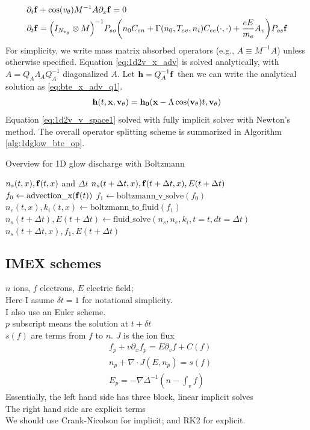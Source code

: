 \documentclass{article}[draft]
\begin{document}
\begin{align}
	&\partial_t \vect{f} + \cos\of{\vtheta} M^{-1} A \partial_x \vect{f} = 0 \label{eq:1d2v_x_adv} \\
	&\partial_t \vect{f} =\of{I_{N_{\vtheta}} \otimes M  }^{-1} P_{so}\of{n_0 C_{en} + \Gamma(n_0, T_{ev}, n_i) C_{ee} (\cdot, \cdot) + \frac{e E}{m_e} A_v} P_{os} \vect{f} \label{eq:1d2v_v_space1}
\end{align} For simplicity, we write mass matrix absorbed operators (e.g., $A \equiv M^{-1} A$) unless otherwise specified. Equation \eqref{eq:1d2v_x_adv} is solved analytically, with $A=Q_A \Lambda_A Q_A^{-1}$ diagonalized $A$. Let $\mathbf{h} = Q_{A}^{-1}\mathbf{f}$ then we can write the analytical solution as \eqref{eq:bte_x_adv_q1}.
\begin{align}
	\mathbf{h}(t,\mathbf{x},\mathbf{{v_{\theta}}}) = \mathbf{h_0}(\mathbf{x} - \Lambda\cos(\mathbf{{v_{\theta}}}) t, \mathbf{{v_{\theta}}}) \label{eq:bte_x_adv_q1}
\end{align} Equation \eqref{eq:1d2v_v_space1} solved with fully implicit solver with Newton's method. 
The overall operator splitting scheme is summarized in Algorithm \ref{alg:1dglow_bte_op}.

\begin{algorithm}[!tbhp]
	\caption{Overview for 1D glow discharge with Boltzmann \label{alg:1dglow_bte_op}}
	\begin{algorithmic}[0]
		\Require $n_s(t,x), \mathbf{f}(t,x)$ and $\Delta t$
		\Ensure $n_s(t + \Delta t, x), \mathbf{f}(t + \Delta t, x), E(t+\Delta t)$ 
		\State $f_0 \leftarrow \text{advection\_x} (\mathbf{f}(t))$
		\State $f_1 \leftarrow \text{boltzmann\_v\_solve} (f_0) $
		\State $n_e(t, x), k_i(t, x) \leftarrow \text{boltzmann\_to\_fluid}(f_1)$ 
		\State $n_s(t + \Delta t), E(t+\Delta t) \leftarrow \text{fluid\_solve}(n_s, n_e, k_i, t = t, dt=\Delta t)$
		\State \Return $n_s(t + \Delta t, x), f_1, E(t+\Delta t)$ 
	\end{algorithmic}
\end{algorithm}

\subsection{IMEX schemes}
\noindent $n$ ions, $f$ electrons, $E$ electric field;\\
Here I asume $\delta t =1$ for notational simplicity.\\
I also use an Euler scheme. \\
$p$ subscript means the solution at $t+\delta t$\\
$s(f)$ are terms from $f$ to $n$.
$J$ is the ion flux
\begin{align}
	&f_p + v \partial_x f_p = E \partial_v f + C(f)\\
	&n_p + \nabla \cdot J(E,n_p) = s(f)\\
	&E_p = -\nabla \Delta^{-1} \left(n-\int_v f\right)
\end{align}
\noindent Essentially, the left hand side has three block, linear implicit solves\\
The right hand side are explicit terms\\
We should use Crank-Nicolson for implicit; and RK2 for explicit.
\end{document}
